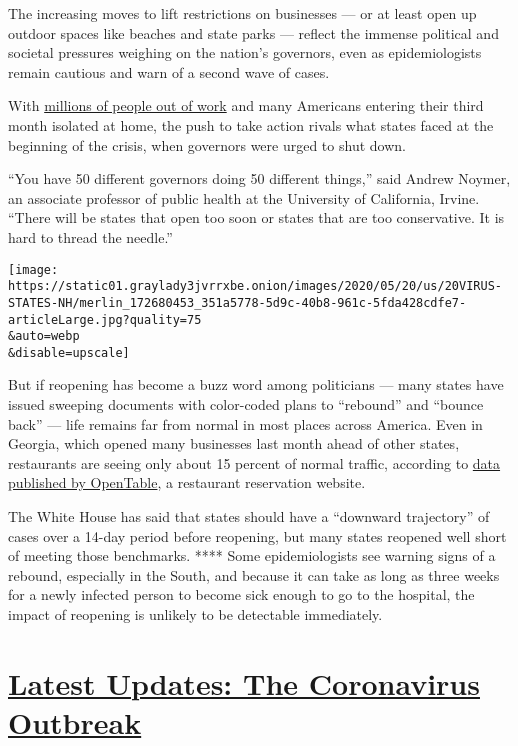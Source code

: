 The increasing moves to lift restrictions on businesses --- or at least
open up outdoor spaces like beaches and state parks --- reflect the
immense political and societal pressures weighing on the nation's
governors, even as epidemiologists remain cautious and warn of a second
wave of cases.

With
\href{https://www.nytimes3xbfgragh.onion/2020/05/14/business/economy/coronavirus-unemployment-claims.html}{millions
of people out of work} and many Americans entering their third month
isolated at home, the push to take action rivals what states faced at
the beginning of the crisis, when governors were urged to shut down.

``You have 50 different governors doing 50 different things,'' said
Andrew Noymer, an associate professor of public health at the University
of California, Irvine. ``There will be states that open too soon or
states that are too conservative. It is hard to thread the needle.''

\texttt{[image: https://static01.graylady3jvrrxbe.onion/images/2020/05/20/us/20VIRUS-STATES-NH/merlin\_172680453\_351a5778-5d9c-40b8-961c-5fda428cdfe7-articleLarge.jpg?quality=75\\\&auto=webp\\\&disable=upscale]}

But if reopening has become a buzz word among politicians --- many
states have issued sweeping documents with color-coded plans to
``rebound'' and ``bounce back'' --- life remains far from normal in most
places across America. Even in Georgia, which opened many businesses
last month ahead of other states, restaurants are seeing only about 15
percent of normal traffic, according to
\href{https://www.opentable.com/state-of-industry}{data published by
OpenTable}, a restaurant reservation website.

The White House has said that states should have a ``downward
trajectory'' of cases over a 14-day period before reopening, but many
states reopened well short of meeting those benchmarks. **** Some
epidemiologists see warning signs of a rebound, especially in the South,
and because it can take as long as three weeks for a newly infected
person to become sick enough to go to the hospital, the impact of
reopening is unlikely to be detectable immediately.

\hypertarget{latest-updates-the-coronavirus-outbreak}{%
\section{\texorpdfstring{\href{https://www.nytimes3xbfgragh.onion/2020/08/21/world/covid-19-coronavirus.html?action=click\&pgtype=Article\&state=default\&region=MAIN_CONTENT_1\&context=storylines_live_updates}{Latest
Updates: The Coronavirus
Outbreak}}{Latest Updates: The Coronavirus Outbreak}}\label{latest-updates-the-coronavirus-outbreak}}


